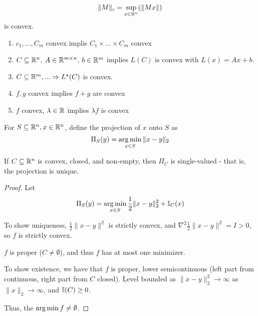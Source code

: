 \begin{remark}
  \begin{align*}
    \| M \|_{\epsilon} = \sup_{x \in \mathbb{R}^{n}} (\| M x\|)
  \end{align*} is convex.
\end{remark}

\begin{proposition}
  \begin{enumerate}
  \item $c_{1}, \dots, C_{m}$ convex implis $C_{1} \times \dots \times
    C_{m}$ convex
  \item $C \subseteq \mathbb{R}^{n}$, $A \in \mathbb{R}^{m \times n}$, $b \in \mathbb{R}^{m}$
    implies $L(C)$ is convex with $L(x) = Ax + b$.
  \item $C \subseteq \mathbb{R}^{m}, ... \Rightarrow L^{\star}(C)$ is convex.
  \item $f, g$ convex implies $f + g$ are convex
  \item $f$ convex, $\lambda \in \mathbb{R}$ implies $\lambda f$ is convex
  \end{enumerate}
\end{proposition}


\begin{defn}
  \label{defn:convexity:7}
  For $S \subseteq \mathbb{R}^{n}, x \in \mathbb{R}^{n}$, define the projection of $x$
  onto $S$ as
  \begin{equation}
    \Pi_{S}(y) = \operatorname*{arg\,min}_{x \in S} \| x - y \|_{2}
  \end{equation}
\end{defn}

\begin{proposition}
  If $C \subseteq \mathbb{R}^{n}$ is convex, closed, and non-empty, then
  $\Pi_{C}$ is single-valued - that is, the projection is unique.
\end{proposition}

\begin{proof}
  Let
  \begin{equation}
    \Pi_{S}(y) = \argmin_{x \in S} \frac{1}{2} \| x - y \|_{2}^{2} + \I_{C}(x)
  \end{equation}

  To show uniqueness, $\frac{1}{2} \| x - y \|^{2}$ is strictly
  convex, and $\nabla^{2} \frac{1}{2} \| x - y \|^{2} = I > 0$, so $f$
  is strictly convex.

  $f$ is proper ($C \neq \emptyset$), and thus $f$ has at most one
  minimizer.

  To show existence, we have that $f$ is proper, lower semicontinuous
  (left part from continuous, right part from $C$ closed). Level
  bounded as $\| x - y \|_{2}^{2} \rightarrow \infty$ as $\| x \|_{2}
  \rightarrow \infty$, and $\I{C} \geq 0$.

  Thus, the $\operatorname*{arg\,min} f \neq \emptyset$.
\end{proof}

